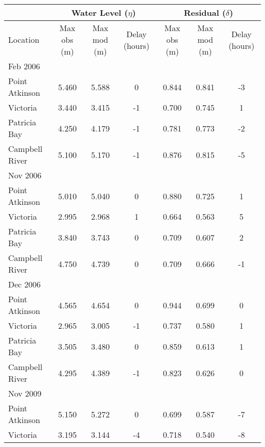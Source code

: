 \documentclass[letterpaper]{tATO2e}
\begin{document}
\begin{table}[h]
\centering 
{}
{\begin{tabular}{|l |c c c | c c c|} 
\hline 
& \multicolumn{3}{|c|}{Water Level ($\eta$)}        & \multicolumn{3}{|c|}{Residual ($\delta$)} \\ 
\hline 
Location       & Max obs (m) & Max mod (m) & Delay (hours) &Max obs (m) & Max mod (m) & Delay (hours) \\
\hline
Feb 2006&  &  &  &  &  & \\
Point Atkinson  & 5.460 & 5.588 & 0 & 0.844 & 0.841 & -3\\
Victoria        & 3.440 & 3.415 & -1 & 0.700 & 0.745 & 1\\
Patricia Bay    & 4.250 & 4.179 & -1 & 0.781 & 0.773 & -2\\
Campbell River  & 5.100 & 5.170 & -1 & 0.876 & 0.815 & -5\\
\hline
Nov 2006 &  &  &  &  &  & \\
Point Atkinson  & 5.010 & 5.040 & 0 & 0.880 & 0.725 & 1\\
Victoria        & 2.995 & 2.968 & 1 & 0.664 & 0.563 & 5\\
Patricia Bay    & 3.840 & 3.743 & 0 & 0.709 & 0.607 & 2\\
Campbell River  & 4.750 & 4.739 & 0 & 0.709 & 0.666 & -1\\
\hline
Dec 2006 &  &  &  &  &  & \\
Point Atkinson  & 4.565 & 4.654 & 0 & 0.944 & 0.699 & 0\\
Victoria        & 2.965 & 3.005 & -1 & 0.737 & 0.580 & 1\\
Patricia Bay    & 3.505 & 3.480 & 0 & 0.859 & 0.613 & 1\\
Campbell River  & 4.295 & 4.389 & -1 & 0.823 & 0.626 & 0\\
\hline
Nov 2009 &  &  &  &  &  & \\
Point Atkinson  & 5.150 & 5.272 & 0 & 0.699 & 0.587 & -7\\
Victoria        & 3.195 & 3.144 & -4 & 0.718 & 0.540 & -8\\

\end{tabular}}
\end{table}
\end{document}
